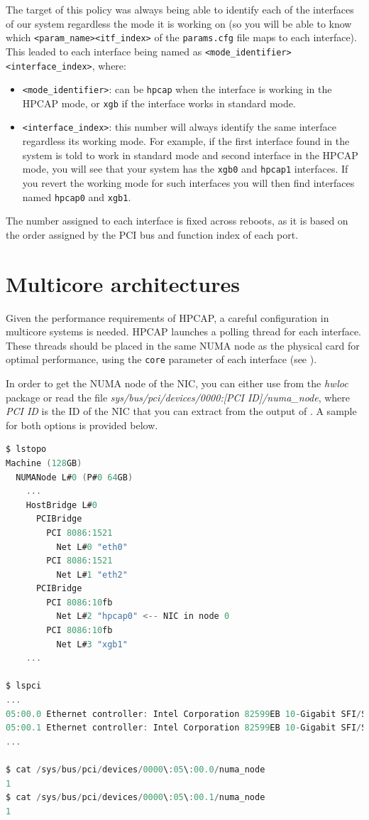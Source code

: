 \documentclass[a4paper,oneside]{hpman}
\begin{document}
The target of this policy was always being able to identify each of the interfaces of our system regardless the mode it is working on (so you will be able to know which \texttt{<param\_name><itf\_index>} of the \texttt{params.cfg} file maps to each interface). This leaded to each interface being named as \texttt{<mode\_identifier><interface\_index>}, where:
\begin{itemize}
    \item \texttt{<mode\_identifier>}: can be \texttt{hpcap} when the interface is working in the HPCAP mode, or \texttt{xgb} if the interface works in standard mode.

    \item \texttt{<interface\_index>}: this number will always identify the same interface regardless its working mode. For example, if the first interface found in the system is told to work in standard mode and second interface in the HPCAP mode, you will see that your system has the \texttt{xgb0} and \texttt{hpcap1} interfaces. If you revert the working mode for such interfaces you will then find interfaces named \texttt{hpcap0} and \texttt{xgb1}.
\end{itemize}

The number assigned to each interface is fixed across reboots, as it is based on the order assigned by the PCI bus and function index of each port.

\section{Multicore architectures}
\label{sec:NUMAArch}

Given the performance requirements of HPCAP, a careful configuration in multicore systems is needed. HPCAP launches a polling thread for each interface. These threads should be placed in the same NUMA node as the physical card for optimal performance, using the \texttt{core} parameter of each interface (see ).

In order to get the NUMA node of the NIC, you can either use  from the \textit{hwloc} package or read the file \textit{sys/bus/pci/devices/0000:[PCI ID]/numa\_node}, where \textit{PCI ID} is the ID of the NIC that you can extract from the output of . A sample for both options is provided below.

\begin{lstlisting}[language=C, caption={Obtaining NUMA information.}, label={lst:NUMA}]
$ lstopo
Machine (128GB)
  NUMANode L#0 (P#0 64GB)
    ...
    HostBridge L#0
      PCIBridge
        PCI 8086:1521
          Net L#0 "eth0"
        PCI 8086:1521
          Net L#1 "eth2"
      PCIBridge
        PCI 8086:10fb
          Net L#2 "hpcap0" <-- NIC in node 0
        PCI 8086:10fb
          Net L#3 "xgb1"
    ...

$ lspci
...
05:00.0 Ethernet controller: Intel Corporation 82599EB 10-Gigabit SFI/SFP+ Network Connection (rev 01)
05:00.1 Ethernet controller: Intel Corporation 82599EB 10-Gigabit SFI/SFP+ Network Connection (rev 01)
...

$ cat /sys/bus/pci/devices/0000\:05\:00.0/numa_node
1
$ cat /sys/bus/pci/devices/0000\:05\:00.1/numa_node
1
\end{lstlisting}
\end{document}
